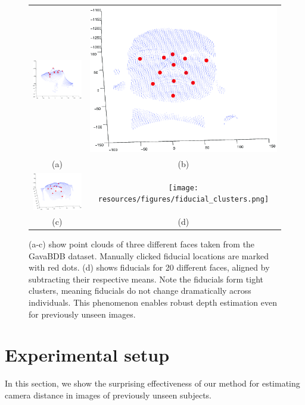 \documentclass[runningheads]{llncs}
\begin{document}
\begin{figure}[h]
\centering
\begin{tabular}{cc}
\includegraphics[width=.4\linewidth]{resources/figures/face1.png} &
\includegraphics[width=.4\linewidth]{resources/figures/face2.png} \\
(a) & (b) \\
\includegraphics[width=.4\linewidth]{resources/figures/face3.png} &
\texttt{[image: resources/figures/fiducial\_clusters.png]} \\
(c) & (d)
\end{tabular}
\caption{
(a-c) show point clouds of three different faces taken from the GavaBDB \cite{moreno2004gavabdb} dataset. 
Manually clicked fiducial locations are marked with red dots.
(d) shows fiducials for 20 different faces, aligned by subtracting their respective means.  
Note the fiducials form tight clusters, meaning fiducials do not change dramatically across individuals.
This phenomenon enables robust depth estimation even for previously unseen images.
}
\label{fig:fiducial_clusters}
\end{figure}

\section{Experimental setup} \label{sec:experiments}
In this section, we show the surprising effectiveness of our method for estimating camera distance in images of previously unseen subjects.
\end{document}
